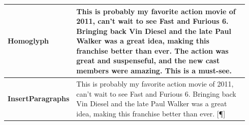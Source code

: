 \documentclass[11pt]{article}
\begin{document}
\begin{table}
\begin{tabular}{p{0.11\linewidth}|p{0.83\linewidth}}
\textbf{Homoglyph}&Th{\color{blue}i}s {\color{blue}i}s {\color{blue}p}r{\color{blue}o}b{\color{blue}a}bl{\color{blue}y} m{\color{blue}y} f{\color{blue}a}v{\color{blue}o}r{\color{blue}i}te {\color{blue}a}{\color{blue}c}t{\color{blue}i}{\color{blue}o}n m{\color{blue}o}v{\color{blue}i}{\color{blue}e} {\color{blue}o}f 2011, {\color{blue}c}{\color{blue}a}n't w{\color{blue}a}{\color{blue}i}t t{\color{blue}o} s{\color{blue}e}{\color{blue}e} F{\color{blue}a}st {\color{blue}a}nd Fur{\color{blue}i}{\color{blue}o}us 6. {\color{blue}B}r{\color{blue}i}ng{\color{blue}i}ng b{\color{blue}a}{\color{blue}c}k V{\color{blue}i}n D{\color{blue}i}{\color{blue}e}s{\color{blue}e}l {\color{blue}a}nd th{\color{blue}e} l{\color{blue}a}t{\color{blue}e} P{\color{blue}a}ul W{\color{blue}a}lk{\color{blue}e}r w{\color{blue}a}s {\color{blue}a} gr{\color{blue}e}{\color{blue}a}t {\color{blue}i}d{\color{blue}e}{\color{blue}a}, m{\color{blue}a}k{\color{blue}i}ng th{\color{blue}i}s fr{\color{blue}a}n{\color{blue}c}h{\color{blue}i}s{\color{blue}e} b{\color{blue}e}tt{\color{blue}e}r th{\color{blue}a}n {\color{blue}e}v{\color{blue}e}r. Th{\color{blue}e} {\color{blue}a}{\color{blue}c}t{\color{blue}i}{\color{blue}o}n w{\color{blue}a}s gr{\color{blue}e}{\color{blue}a}t {\color{blue}a}nd sus{\color{blue}p}{\color{blue}e}ns{\color{blue}e}ful, {\color{blue}a}nd th{\color{blue}e} n{\color{blue}e}w {\color{blue}c}{\color{blue}a}st m{\color{blue}e}mb{\color{blue}e}rs w{\color{blue}e}r{\color{blue}e} {\color{blue}a}m{\color{blue}a}z{\color{blue}i}ng. Th{\color{blue}i}s {\color{blue}i}s {\color{blue}a} must-s{\color{blue}e}{\color{blue}e}.\\
\midrule
\textbf{Insert\newline Paragraphs}&This is probably my favorite action movie of 2011, can't wait to see Fast and Furious 6. Bringing back Vin Diesel and the late Paul Walker was a great idea, making this franchise better than ever.\newline
{\color{blue}[\P]}


\end{tabular}
\end{table}
\end{document}
